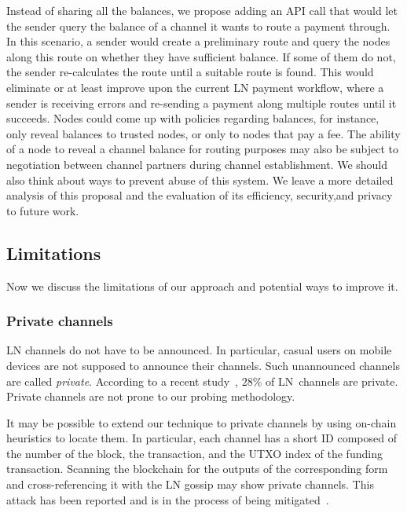 Instead of sharing all the balances, we propose adding an API call that would let the sender query the balance of a channel it wants to route a payment through.
In this scenario, a sender would create a preliminary route and query the nodes along this route on whether they have sufficient balance.
If some of them do not, the sender re-calculates the route until a suitable route is found.
This would eliminate or at least improve upon the current LN payment workflow, where a sender is receiving errors and re-sending a payment along multiple routes until it succeeds.
Nodes could come up with policies regarding balances, for instance, only reveal balances to trusted nodes, or only to nodes that pay a fee.
The ability of a node to reveal a channel balance for routing purposes may also be subject to negotiation between channel partners during channel establishment.
We should also think about ways to prevent abuse of this system.
We leave a more detailed analysis of this proposal and the evaluation of its efficiency, security,and privacy to future work.



\subsection{Limitations}

Now we discuss the limitations of our approach and potential ways to improve it.

\subsubsection*{Private channels}

LN channels do not have to be announced.
In particular, casual users on mobile devices are not supposed to announce their channels.
Such unannounced channels are called \textit{private}.
According to a recent study~\cite{BitMEXPrivateChannels}, $28\%$ of LN~channels are private.
Private channels are not prone to our probing methodology.

It may be possible to extend our technique to private channels by using on-chain heuristics to locate them.
In particular, each channel has a short ID composed of the number of the block, the transaction, and the UTXO index of the funding transaction.
Scanning the blockchain for the outputs of the corresponding form and cross-referencing it with the LN gossip may show private channels.
This attack has been reported and is in the process of being mitigated~\cite{Pickhardt2020}.

